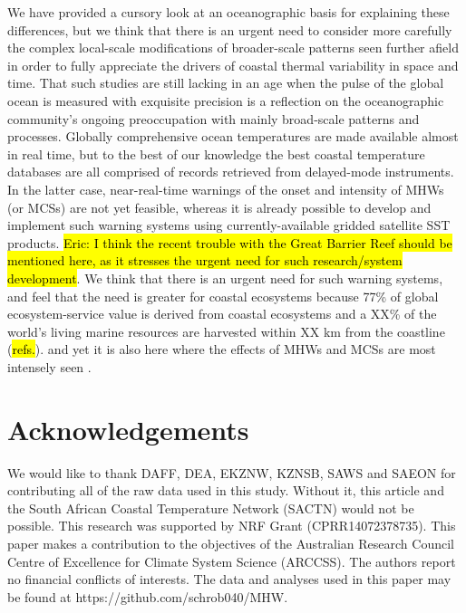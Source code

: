 \documentclass[a4paper,10pt,review]{elsarticle}
\begin{document}
We have provided a cursory look at an oceanographic basis for explaining these differences, but we think that there is an urgent need to consider more carefully the complex local-scale modifications of broader-scale patterns seen further afield in order to fully appreciate the drivers of coastal thermal variability in space and time. That such studies are still lacking in an age when the pulse of the global ocean is measured with exquisite precision is a reflection on the oceanographic community's ongoing preoccupation with mainly broad-scale patterns and processes. Globally comprehensive ocean temperatures are made available almost in real time, but to the best of our knowledge the best coastal temperature databases are all comprised of records retrieved from delayed-mode instruments. In the latter case, near-real-time warnings of the onset and intensity of MHWs (or MCSs) are not yet feasible, whereas it is already possible to develop and implement such warning systems using currently-available gridded satellite SST products. \hl{Eric: I think the recent trouble with the Great Barrier Reef should be mentioned here, as it stresses the urgent need for such research/system development}. We think that there is an urgent need for such warning systems, and feel that the need is greater for coastal ecosystems because 77\% of global ecosystem-service value is derived from coastal ecosystems \citep{Martinez2007} and a XX\% of the world's living marine resources are harvested within XX km from the coastline (\hl{refs.}). and yet it is also here where the effects of MHWs and MCSs are most intensely seen .


\section*{Acknowledgements}
We would like to thank DAFF, DEA, EKZNW, KZNSB, SAWS and SAEON for contributing all of the raw data used in this study. Without it, this article and the South African Coastal Temperature Network (SACTN) would not be possible. This research was supported by NRF Grant (CPRR14072378735). This paper makes a contribution to the objectives of the Australian Research Council Centre of Excellence for Climate System Science (ARCCSS). The authors report no financial conflicts of interests. The data and analyses used in this paper may be found at https://github.com/schrob040/MHW.
\end{document}
